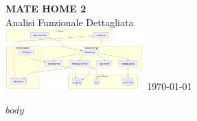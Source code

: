 \documentclass[11pt,a4paper]{article}
\begin{document}
\begin{titlepage}
\pagecolor{background}
\begin{center}
\vspace*{2cm}
{\Huge\bfseries\color{primary}MATE HOME 2\\[1ex]}
{\Large\color{secondary}Analisi Funzionale Dettagliata\\[3ex]}
\vspace{2cm}
\includegraphics[width=0.4\textwidth]{docs/diagrams/architecture.png}
\vfill
{\large\color{secondary}\today}
\end{center}
\end{titlepage}
\nopagecolor

\tableofcontents
\newpage

$body$
\end{document}
